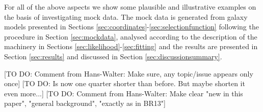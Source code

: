 For all of the above aspects we show some plausible and illustrative examples on the basis of investigating mock data. The mock data is generated from galaxy models presented in Sections \ref{sec:coordinates}-\ref{sec:selectionfunction} following the procedure in Section \ref{sec:mockdata}, analysed according to the description of the \RM{} machinery in Sections \ref{sec:likelihood}-\ref{sec:fitting} and the results are presented in Section \ref{sec:results} and discussed in Section \ref{sec:discussionsummary}.

[TO DO: Comment from Hans-Walter: Make sure, any topic/issue appears only once]
[TO DO: Is now one quarter shorter than before. But maybe shorten it even more...]
[TO DO: Comment from Hans-Walter: Make clear "new in this paper", "general background", "exactly as in BR13"]